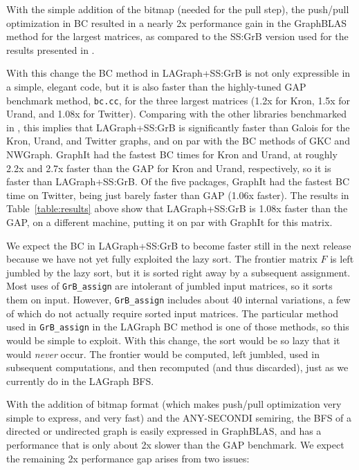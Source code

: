 
With the simple addition of the bitmap (needed for the pull step), the
push/pull optimization in BC resulted in a nearly 2x performance gain in the
GraphBLAS method for the largest matrices, as compared to the SS:GrB version
used for the results presented in \cite{DBLP:conf/iiswc/AzadABBCDDDDFGG20}.

With this change the BC method in LAGraph+SS:GrB is not only expressible in a
simple, elegant code, but it is also faster than the highly-tuned GAP benchmark
method, \verb'bc.cc', for the three largest matrices (1.2x for Kron, 1.5x for
Urand, and 1.08x for Twitter).  Comparing with the other libraries benchmarked
in \cite{DBLP:conf/iiswc/AzadABBCDDDDFGG20}, this implies that LAGraph+SS:GrB
is significantly faster than Galois for the Kron, Urand, and Twitter graphs,
and on par with the BC methods of GKC and NWGraph.  GraphIt had the fastest BC
times for Kron and Urand, at roughly 2.2x and 2.7x faster than the GAP for Kron
and Urand, respectively, so it is faster than LAGraph+SS:GrB.  Of the five
packages, GraphIt had the fastest BC time on Twitter, being just barely faster
than GAP (1.06x faster).  The results in Table~\ref{table:results} above show
that LAGraph+SS:GrB is 1.08x faster than the GAP, on a different machine,
putting it on par with GraphIt for this matrix.

We expect the BC in LAGraph+SS:GrB to become faster still in the next
release because we have not yet fully exploited the lazy sort.  The frontier
matrix $F$ is left jumbled by the lazy sort, but it is sorted right away by a
subsequent assignment.  Most uses of \verb'GrB_assign' are intolerant of
jumbled input matrices, so it sorts them on input.  However, \verb'GrB_assign'
includes about 40 internal variations, a few of which do not actually require
sorted input matrices.  The particular method used in \verb'GrB_assign' in the
LAGraph BC method is one of those methods, so this would be simple to exploit.
With this change, the sort would be so lazy that it would {\em never} occur.
The frontier would be computed, left jumbled, used in subsequent computations,
and then recomputed (and thus discarded), just as we currently do in the
LAGraph BFS.

With the addition of bitmap format (which makes push/pull optimization very
simple to express, and very fast) and the ANY-SECONDI semiring, the BFS of a
directed or undirected graph is easily expressed in GraphBLAS, and has a
performance that is only about 2x slower than the GAP benchmark.  We expect
the remaining 2x performance gap arises from two issues:

